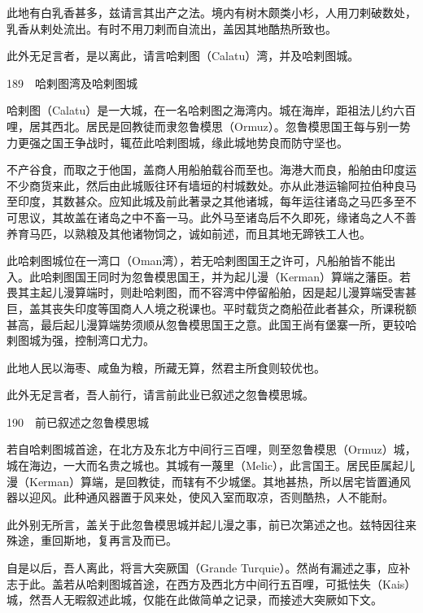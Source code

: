\documentclass[12pt,UTF8]{ctexbook}
\begin{document}
此地有白乳香甚多，兹请言其出产之法。境内有树木颇类小杉，人用刀剌破数处，乳香从剌处流出。有时不用刀剌而自流出，盖因其地酷热所致也。

此外无足言者，是以离此，请言哈剌图（Calatu）湾，并及哈剌图城。





189　哈剌图湾及哈剌图城

哈剌图（Calatu）是一大城，在一名哈剌图之海湾内。城在海岸，距祖法儿约六百哩，居其西北。居民是回教徒而隶忽鲁模思（Ormuz）。忽鲁模思国王每与别一势力更强之国王争战时，辄莅此哈剌图城，缘此城地势良而防守坚也。

不产谷食，而取之于他国，盖商人用船舶载谷而至也。海港大而良，船舶由印度运不少商货来此，然后由此城贩往环有墙垣的村城数处。亦从此港运输阿拉伯种良马至印度，其数甚众。应知此城及前此著录之其他诸城，每年运往诸岛之马匹多至不可思议，其故盖在诸岛之中不畜一马。此外马至诸岛后不久即死，缘诸岛之人不善养育马匹，以熟粮及其他诸物饲之，诚如前述，而且其地无蹄铁工人也。

此哈剌图城位在一湾口（Oman湾），若无哈剌图国王之许可，凡船舶皆不能出入。此哈剌图国王同时为忽鲁模思国王，并为起儿漫（Kerman）算端之藩臣。若畏其主起儿漫算端时，则赴哈剌图，而不容湾中停留船舶，因是起儿漫算端受害甚巨，盖其丧失印度等国商人人境之税课也。平时载货之商船莅此者甚众，所课税额甚高，最后起儿漫算端势须顺从忽鲁模思国王之意。此国王尚有堡寨一所，更较哈剌图城为强，控制湾口尤力。

此地人民以海枣、咸鱼为粮，所藏无算，然君主所食则较优也。

此外无足言者，吾人前行，请言前此业已叙述之忽鲁模思城。





190　前已叙述之忽鲁模思城

若自哈剌图城首途，在北方及东北方中间行三百哩，则至忽鲁模思（Ormuz）城，城在海边，一大而名贵之城也。其城有一蔑里（Melic），此言国王。居民臣属起儿漫（Kerman）算端，是回教徒，而辖有不少城堡。其地甚热，所以居宅皆置通风器以迎风。此种通风器置于风来处，使风入室而取凉，否则酷热，人不能耐。

此外别无所言，盖关于此忽鲁模思城并起儿漫之事，前已次第述之也。兹特因往来殊途，重回斯地，复再言及而已。

自是以后，吾人离此，将言大突厥国（Grande Turquie）。然尚有漏述之事，应补志于此。盖若从哈剌图城首途，在西方及西北方中间行五百哩，可抵怯失（Kais）城，然吾人无暇叙述此城，仅能在此做简单之记录，而接述大突厥如下文。
\end{document}
